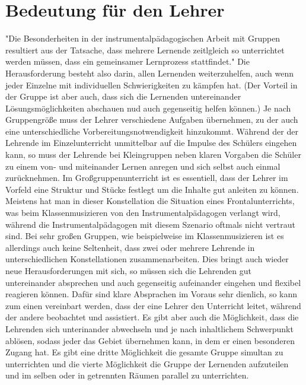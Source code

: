 \section{Bedeutung für den Lehrer}

"Die Besonderheiten in der instrumentalpädagogischen Arbeit mit Gruppen
resultiert aus der Tatsache, dass mehrere Lernende zeitlgleich so unterrichtet
werden müssen, dass ein gemeinsamer Lernprozess stattfindet."
\autocite[221]{busch:grundwissen_instrumentalpaedagogik} Die Herausforderung
besteht also darin, allen Lernenden weiterzuhelfen, auch wenn jeder Einzelne mit
individuellen Schwierigkeiten zu kämpfen hat. (Der Vorteil in der Gruppe ist aber
auch, dass sich die Lernenden untereinander Lösungsmöglichkeiten abschauen nud
auch gegenseitig helfen können.) 
Je nach Gruppengröße muss der Lehrer verschiedene Aufgaben übernehmen,
zu der
auch eine unterschiedliche Vorbereitungsnotwendigkeit hinzukommt. Während der
der Lehrende im Einzelunterricht unmittelbar auf die Impulse des Schülers
eingehen kann, so muss der Lehrende bei Kleingruppen neben klaren Vorgaben die
Schüler zu einem von- und miteinander Lernen anregen und sich selbst auch einmal
zurücknehmen. Im Großgruppenunterricht ist es essentiell, dass der Lehrer im
Vorfeld eine Struktur und Stücke festlegt um die Inhalte gut anleiten zu können.\autocite[220]{busch:grundwissen_instrumentalpaedagogik}
Meistens hat man in dieser Konstellation die Situation eines Frontalunterrichts,
was beim Klassenmusizieren von den Instrumentalpädagogen verlangt wird, während die
Instrumentalpädagogen mit diesem Szenario oftmals nicht vertraut sind. Bei sehr
großen Gruppen, wie beispielweise im
Klassenmusizieren ist es allerdings auch keine Seltenheit, dass zwei oder
mehrere Lehrende in unterschiedlichen Konstellationen zusammenarbeiten. Dies
bringt auch wieder neue Herausforderungen mit sich, so müssen sich die Lehrenden
gut untereinander absprechen und auch gegenseitig aufeinander eingehen und
flexibel reagieren können. Dafür sind klare Absprachen im Voraus sehr dienlich,
so kann zum einen vereinbart werden, dass der eine Lehrer den Unterricht leitet,
während der andere beobachtet und assistiert. Es gibt aber auch die Möglichkeit,
dass die Lehrenden sich unterinander abwechseln und je nach inhaltlichem
Schwerpunkt ablösen, sodass jeder das Gebiet übernehmen kann, in dem er einen
besonderen Zugang hat. Es gibt eine dritte Möglichkeit die gesamte Gruppe
simultan zu unterrichten und die vierte Möglichkeit die Gruppe der Lernenden
aufzuteilen und im selben oder in getrennten Räumen parallel zu unterrichten.
\autocite{cook s. 461} 

